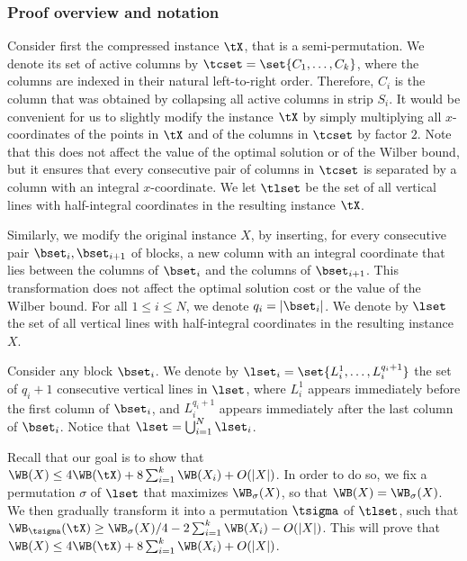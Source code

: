 %
%
%
%
\subsubsection{Proof overview and notation}

%
%
%
%

Consider first the compressed instance $\tX$, that is a semi-permutation. We denote its set of active columns by $\tcset=\set{C_1,\ldots,C_k}$, where the columns are indexed in their natural left-to-right order. Therefore, $C_i$ is the column that was obtained by collapsing all active columns in strip $S_i$. %
%
%
%
%
It would be convenient for us to slightly modify the instance $\tX$ by simply multiplying all $x$-coordinates of the points in $\tX$ and of the columns in $\tcset$ by factor $2$. Note that this does not affect the value of the optimal solution or of the Wilber bound, but it ensures that every consecutive pair of columns in $\tcset$ is separated by a column with an integral $x$-coordinate. We let $\tlset$ be the set of all vertical lines with half-integral coordinates in the resulting instance $\tX$.

Similarly, we modify the original instance $X$, by inserting, for every consecutive pair $\bset_i,\bset_{i+1}$ of blocks, a new column with an integral coordinate that lies between the columns of $\bset_{i}$ and the columns of $\bset_{{i+1}}$. This transformation does not affect the optimal solution cost or the value of the Wilber bound. For all $1\leq i\leq N$, we denote $q_i=|\bset_i|$.
%
We denote by $\lset$ the set of all vertical lines with half-integral coordinates in the resulting instance $X$.

Consider any block $\bset_i$. We denote by $\lset_i=\set{L_i^1,\ldots,L_i^{q_i+1}}$ the set of $q_i+1$ consecutive vertical lines in $\lset$, where $L_i^1$ appears immediately before the first column of $\bset_i$, and $L_i^{q_i+1}$ appears immediately after the last column of $\bset_i$. Notice that $\lset=\bigcup_{i=1}^N\lset_i$.

Recall that our goal is to show that $\WB(X)\leq 4\WB(\tX)+8\sum_{i=1}^k\WB(X_i)+O(|X|)$. In order to do so, we fix a permutation $\sigma$ of $\lset$ that maximizes $\WB_{\sigma}(X)$, so that $\WB(X)=\WB_{\sigma}(X)$. We then gradually transform it into a permutation $\tsigma$ of $\tlset$, such that $\WB_{\tsigma}(\tX)\geq \WB_{\sigma}(X)/4-2\sum_{i=1}^k\WB(X_i)-O(|X|)$. This will prove that $\WB(X)\leq 4\WB(\tX)+8\sum_{i=1}^k\WB(X_i)+O(|X|)$.

